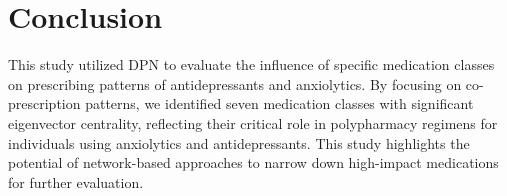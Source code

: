 \documentclass[
  authoryear,
  review]{elsarticle}
\begin{document}
\section{Conclusion}\label{conclusion}

This study utilized DPN to evaluate the influence of specific medication
classes on prescribing patterns of antidepressants and anxiolytics. By
focusing on co-prescription patterns, we identified seven medication
classes with significant eigenvector centrality, reflecting their
critical role in polypharmacy regimens for individuals using anxiolytics
and antidepressants. This study highlights the potential of
network-based approaches to narrow down high-impact medications for
further evaluation.


\renewcommand\refname{References}
  
\end{document}

